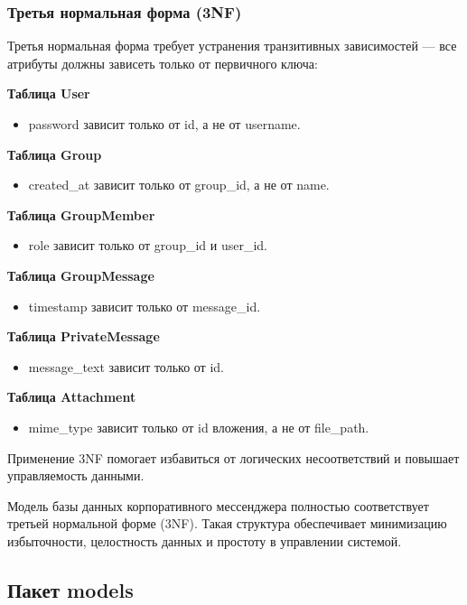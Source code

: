 \subsubsection{Третья нормальная форма (3NF)}

Третья нормальная форма требует устранения транзитивных зависимостей — все атрибуты должны зависеть только от первичного ключа:

\textbf{Таблица User}  
\begin{itemize}
	\item password зависит только от id, а не от username.
\end{itemize}

\textbf{Таблица Group}  
\begin{itemize}
	\item created\_at зависит только от group\_id, а не от name.
\end{itemize}

\textbf{Таблица GroupMember}  
\begin{itemize}
	\item role зависит только от group\_id и user\_id.
\end{itemize}

\textbf{Таблица GroupMessage}  
\begin{itemize}
	\item timestamp зависит только от message\_id.
\end{itemize}

\textbf{Таблица PrivateMessage}  
\begin{itemize}
	\item message\_text зависит только от id.
\end{itemize}

\textbf{Таблица Attachment}  
\begin{itemize}
	\item mime\_type зависит только от id вложения, а не от file\_path.
\end{itemize}

Применение 3NF помогает избавиться от логических несоответствий и повышает управляемость данными.

Модель базы данных корпоративного мессенджера полностью соответствует третьей нормальной форме (3NF). Такая структура обеспечивает минимизацию избыточности, целостность данных и простоту в управлении системой.

\subsection{Пакет models}

